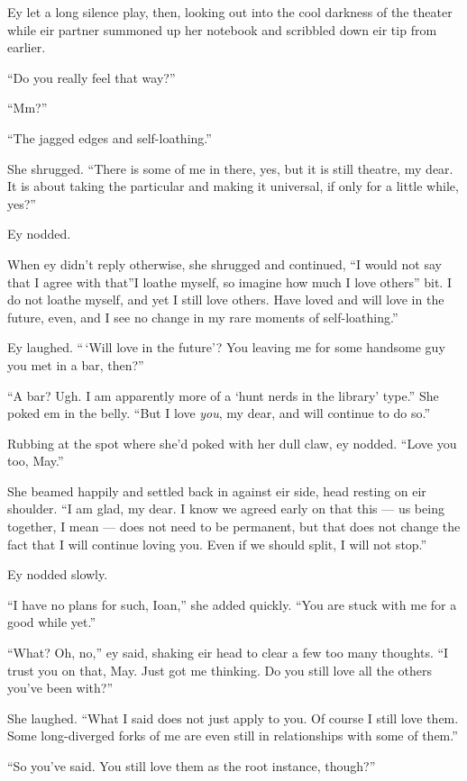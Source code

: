 Ey let a long silence play, then, looking out into the cool darkness of the theater while eir partner summoned up her notebook and scribbled down eir tip from earlier.

``Do you really feel that way?''

``Mm?''

``The jagged edges and self-loathing.''

She shrugged. ``There is some of me in there, yes, but it is still theatre, my dear. It is about taking the particular and making it universal, if only for a little while, yes?''

Ey nodded.

When ey didn't reply otherwise, she shrugged and continued, ``I would not say that I agree with that''I loathe myself, so imagine how much I love others'' bit. I do not loathe myself, and yet I still love others. Have loved and will love in the future, even, and I see no change in my rare moments of self-loathing.''

Ey laughed. ``\,`Will love in the future'? You leaving me for some handsome guy you met in a bar, then?''

``A bar? Ugh. I am apparently more of a `hunt nerds in the library' type.'' She poked em in the belly. ``But I love \emph{you}, my dear, and will continue to do so.''

Rubbing at the spot where she'd poked with her dull claw, ey nodded. ``Love you too, May.''

She beamed happily and settled back in against eir side, head resting on eir shoulder. ``I am glad, my dear. I know we agreed early on that this — us being together, I mean — does not need to be permanent, but that does not change the fact that I will continue loving you. Even if we should split, I will not stop.''

Ey nodded slowly.

``I have no plans for such, Ioan,'' she added quickly. ``You are stuck with me for a good while yet.''

``What? Oh, no,'' ey said, shaking eir head to clear a few too many thoughts. ``I trust you on that, May. Just got me thinking. Do you still love all the others you've been with?''

She laughed. ``What I said does not just apply to you. Of course I still love them. Some long-diverged forks of me are even still in relationships with some of them.''

``So you've said. You still love them as the root instance, though?''

